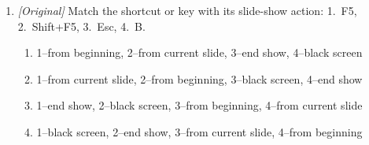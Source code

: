 \begin{enumerate}[label=\textbf{Q\arabic*.}, leftmargin=*]
\begin{enumerate}[label=\Roman*.]
    \item Reading View is the top-level slide controlling all layouts.
  \end{enumerate}
  \begin{enumerate}[label=\Alph*.]
    \item I only
    \item I and II only
    \item II and III only
    \item I, II, and III
  \end{enumerate}
\item \textit{[Original]} Match the shortcut or key with its slide-show
  action: 1.~F5, 2.~Shift+F5, 3.~Esc, 4.~B.
  \begin{enumerate}[label=\Alph*.]
    \item 1--from beginning, 2--from current slide, 3--end show, 4--black screen
    \item 1--from current slide, 2--from beginning, 3--black screen, 4--end show
    \item 1--end show, 2--black screen, 3--from beginning, 4--from current slide
    \item 1--black screen, 2--end show, 3--from current slide, 4--from beginning
  \end{enumerate}


\end{enumerate}
